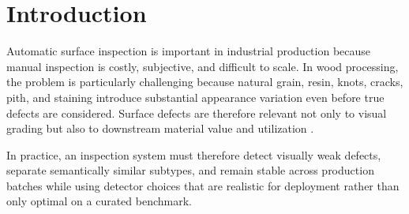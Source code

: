 \documentclass[cmc,article,submit,moreauthors,pdftex]{Definitions/tsp}
\begin{document}
\section{Introduction}
\label{sec:introduction}

Automatic surface inspection is important in industrial production because manual inspection is costly, subjective, and difficult to scale. In wood processing, the problem is particularly challenging because natural grain, resin, knots, cracks, pith, and staining introduce substantial appearance variation even before true defects are considered. Surface defects are therefore relevant not only to visual grading but also to downstream material value and utilization \citep{kodytek_dataset}.

In practice, an inspection system must therefore detect visually weak defects, separate semantically similar subtypes, and remain stable across production batches while using detector choices that are realistic for deployment rather than only optimal on a curated benchmark.

\end{document}
